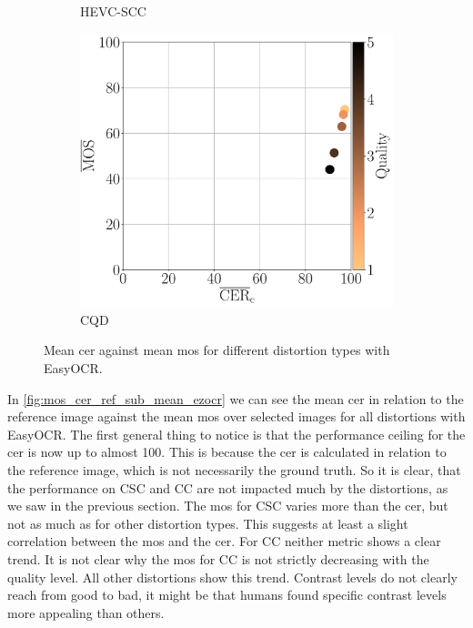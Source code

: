 \begin{figure}[h]
\begin{subfigure}[b]{0.3\textwidth}
        \caption{HEVC-SCC}
        \label{fig:mos_cer_ref_mean_ezocr_HEVC-SCC}
    \end{subfigure}
    \hfill
    \begin{subfigure}[b]{0.3\textwidth}
        \includegraphics[width=\textwidth]{../../images/analyze/mos_cer_ref_mean_ezocr_CQD.pdf}
        \caption{CQD}
        \label{fig:mos_cer_ref_mean_ezocr_CQD}
    \end{subfigure}
\caption{Mean \gls{cer} against mean \gls{mos} for different distortion types with EasyOCR.}
\label{fig:mos_cer_ref_mean_ezocr}
\end{figure}

In \autoref{fig:mos_cer_ref_sub_mean_ezocr} we can see the mean \gls{cer} in relation to the reference image against the mean \gls{mos} over selected images for all distortions with EasyOCR.
The first general thing to notice is that the performance ceiling for the \gls{cer} is now up to almost 100.
This is because the \gls{cer} is calculated in relation to the reference image, which is not necessarily the ground truth.
So it is clear, that the performance on CSC and CC are not impacted much by the distortions, as we saw in the previous section.
The \gls{mos} for CSC varies more than the \gls{cer}, but not as much as for other distortion types.
This suggests at least a slight correlation between the \gls{mos} and the \gls{cer}.
For CC neither metric shows a clear trend.
It is not clear why the \gls{mos} for CC is not strictly decreasing with the quality level.
All other distortions show this trend.
Contrast levels do not clearly reach from good to bad, it might be that humans found specific contrast levels more appealing than others.


